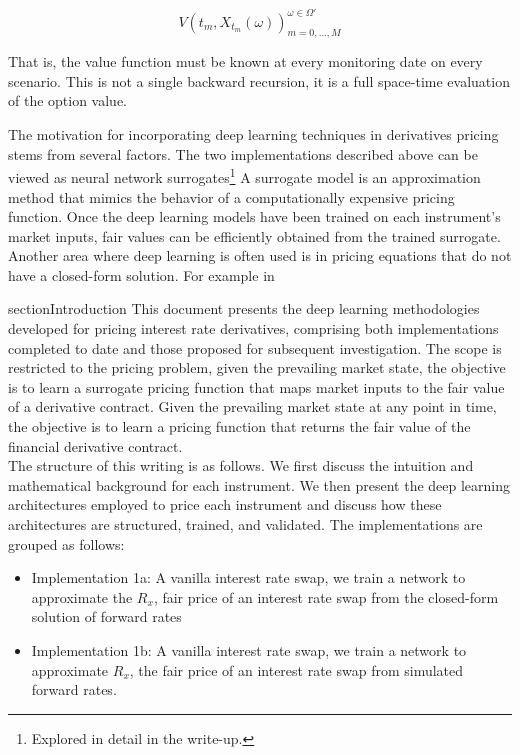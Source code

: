   \begin{equation}
      {V(t_m, X_{t_m}(\omega))}_{m=0,\ldots,M}^{\omega \in \Omega'}
  \end{equation}

  \noindent
  That is, the value function must be known at every monitoring date on every scenario. This is not a single backward recursion, it is a full space-time evaluation of the option value.




    \noindent
    The motivation for incorporating deep learning techniques in derivatives pricing stems from several factors. The two implementations described above can be viewed as neural network surrogates\footnote{Explored in detail in the write-up.} A surrogate model is an approximation method that mimics the behavior of a computationally expensive pricing function. Once the deep learning models have been trained on each instrument's market inputs, fair values can be efficiently obtained from the trained surrogate. \\

    \noindent
    Another area where deep learning is often used is in pricing equations that do not have a closed-form solution. For example in

    section{Introduction}
    This document presents the deep learning methodologies developed for pricing interest rate derivatives, comprising both implementations completed to date and those proposed for subsequent investigation. The scope is restricted to the pricing problem, given the prevailing market state, the objective is to learn a surrogate pricing function that maps market inputs to the fair value of a derivative contract. Given the prevailing market state at any point in time, the objective is to learn a pricing function that returns the fair value of the financial derivative contract.  \\

    \noindent
    The structure of this writing is as follows. We first discuss the intuition and mathematical background for each instrument. We then present the deep learning architectures employed to price each instrument and discuss how these architectures are structured, trained, and validated. The implementations are grouped as follows:
    \begin{itemize}
        \item Implementation 1a: A vanilla interest rate swap, we train a network to approximate the $R_x$, fair price of an interest rate swap from the closed-form solution of forward rates
        \item Implementation 1b: A vanilla interest rate swap, we train a network to approximate $R_x$, the fair price of an interest rate swap from simulated forward rates. 
    \end{itemize}

